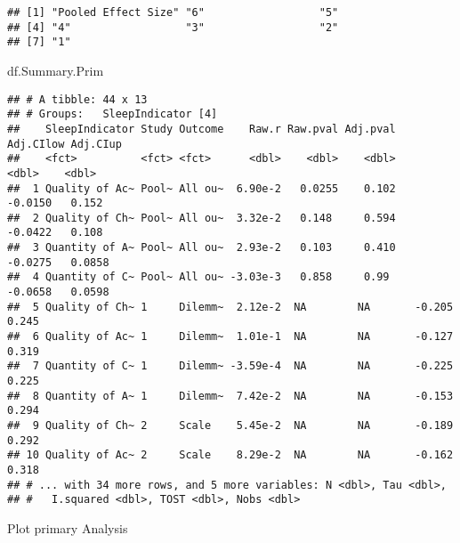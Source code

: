 \documentclass[
]{book}
\newenvironment{Shaded}{\begin{snugshade}}{\end{snugshade}}
\newcommand{\NormalTok}[1]{#1}
\begin{document}
\begin{verbatim}
## [1] "Pooled Effect Size" "6"                  "5"                 
## [4] "4"                  "3"                  "2"                 
## [7] "1"
\end{verbatim}

\begin{Shaded}
\begin{Highlighting}[]
\NormalTok{df.Summary.Prim}
\end{Highlighting}
\end{Shaded}

\begin{verbatim}
## # A tibble: 44 x 13
## # Groups:   SleepIndicator [4]
##    SleepIndicator Study Outcome    Raw.r Raw.pval Adj.pval Adj.CIlow Adj.CIup
##    <fct>          <fct> <fct>      <dbl>    <dbl>    <dbl>     <dbl>    <dbl>
##  1 Quality of Ac~ Pool~ All ou~  6.90e-2   0.0255    0.102   -0.0150   0.152 
##  2 Quality of Ch~ Pool~ All ou~  3.32e-2   0.148     0.594   -0.0422   0.108 
##  3 Quantity of A~ Pool~ All ou~  2.93e-2   0.103     0.410   -0.0275   0.0858
##  4 Quantity of C~ Pool~ All ou~ -3.03e-3   0.858     0.99    -0.0658   0.0598
##  5 Quality of Ch~ 1     Dilemm~  2.12e-2  NA        NA       -0.205    0.245 
##  6 Quality of Ac~ 1     Dilemm~  1.01e-1  NA        NA       -0.127    0.319 
##  7 Quantity of C~ 1     Dilemm~ -3.59e-4  NA        NA       -0.225    0.225 
##  8 Quantity of A~ 1     Dilemm~  7.42e-2  NA        NA       -0.153    0.294 
##  9 Quality of Ch~ 2     Scale    5.45e-2  NA        NA       -0.189    0.292 
## 10 Quality of Ac~ 2     Scale    8.29e-2  NA        NA       -0.162    0.318 
## # ... with 34 more rows, and 5 more variables: N <dbl>, Tau <dbl>,
## #   I.squared <dbl>, TOST <dbl>, Nobs <dbl>
\end{verbatim}

Plot primary Analysis
\end{document}
